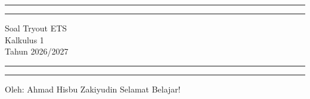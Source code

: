 \documentclass[10pt,openany,a4paper]{article}
\theoremstyle{definition}
\theoremstyle{definition}
\theoremstyle{plain}
\begin{document}
\begin{titlepage}
	\centering %
	\vspace*{1.5\baselineskip} %

	\rule{13cm}{1.6pt}\vspace*{-\baselineskip}\vspace*{2pt} %
	\rule{13cm}{0.4pt} %
	
		\vspace{0.75\baselineskip} %
	{	\Huge Soal Tryout ETS\\ 
			\vspace{4mm}
		Kalkulus 1 \\ \vspace{2mm} \huge{Tahun 2026/2027}\\	}
		\vspace{0.75\baselineskip} %
	\rule{13cm}{0.4pt}\vspace*{-\baselineskip}\vspace{3.2pt} %
	\rule{13cm}{1.6pt} %
	
		\vspace{1.75\baselineskip} %
{\large Oleh: Ahmad Hisbu Zakiyudin}
	\vfill
	\vspace{1mm}
\huge{Selamat Belajar!}
\end{titlepage}
\makeatletter
\setlength\fboxsep{3pt}
\setlength{\headheight}{24pt}
\newcommand{\kopsoal}[5]{%
 \begin{center}
	{\underline{\textbf{\MakeUppercase{Tryout ETS Kalkulus 1 Tahun 2026/2027}}}}
    \end{center}

    \begin{center}
	\begin{tabular}{lcl}
		Mata kuliah/SKS & : & Kalkulus 1 ( SM234101 ) / 3 SKS\\
		Kelompok & : & #1\\
		Kelas & : & #2\\
		Departemen & : & #3\\
		Jadwal kuliah & : & #4\\
		Sesi & : & #5\\
		Waktu & : & 100 menit\\
		Sifat & : & Tertutup\\
  ~
	\end{tabular}

    \noindent\rule{\textwidth}{2.pt}
        \end{center}}
\end{document}
